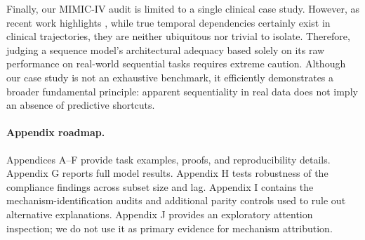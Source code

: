 \documentclass{article}
\theoremstyle{plain}
\theoremstyle{definition}
\theoremstyle{remark}
\begin{document}
Finally, our MIMIC-IV audit is limited to a single clinical case study. However, as recent work highlights \citep{edelman2026order_specific_ehr}, while true temporal dependencies certainly exist in clinical trajectories, they are neither ubiquitous nor trivial to isolate. Therefore, judging a sequence model's architectural adequacy based solely on its raw performance on real-world sequential tasks requires extreme caution. Although our case study is not an exhaustive benchmark, it efficiently demonstrates a broader fundamental principle: apparent sequentiality in real data does not imply an absence of predictive shortcuts.

\newpage








\newpage
\appendix

\paragraph{Appendix roadmap.}
Appendices A--F provide task examples, proofs, and reproducibility details. Appendix G reports full model results. Appendix H tests robustness of the compliance findings across subset size and lag. Appendix I contains the mechanism-identification audits and additional parity controls used to rule out alternative explanations. Appendix J provides an exploratory attention inspection; we do not use it as primary evidence for mechanism attribution.
\end{document}
